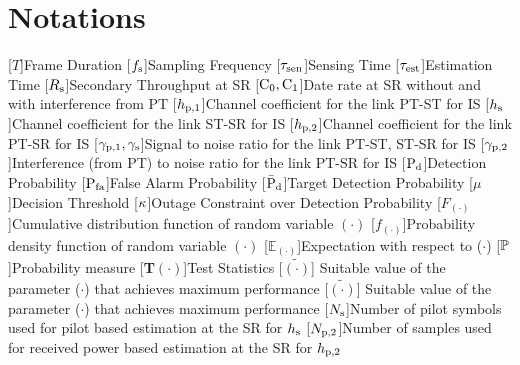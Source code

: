 \section*{Notations}
\begin{acronym}[ANNNNOVA]
 [$T$]{Frame Duration}
 [$f_{\text{s}}$]{Sampling Frequency}
 [$\tau_{\text{sen}}$]{Sensing Time}
 [$\tau_{\text{est}}$]{Estimation Time}
 [$R_{\text{s}}$]{Secondary Throughput at SR}
 [$\text{C}_{\text{0}},\text{C}_{\text{1}}$]{Date rate at SR without and with interference from PT}
 [$h_{\text{p,1}}$]{Channel coefficient for the link PT-ST for IS}
 [$h_{\text{s}}$]{Channel coefficient for the link ST-SR for IS}
 [$h_{\text{p,2}}$]{Channel coefficient for the link PT-SR for IS}
 [${\gamma}_{\text{p,1}}, {\gamma}_{\text{s}}$]{Signal to noise ratio for the link PT-ST, ST-SR for IS}
 [${\gamma}_{\text{p,2}}$]{Interference (from PT) to noise ratio for the link PT-SR for IS}
 [$\text{P}_{\text{d}}$]{Detection Probability} 
 [$\text{P}_{\text{fa}}$]{False Alarm Probability} 
 [$\bar{\text{P}}_{\text{d}}$]{Target Detection Probability} 
 [$\mu$]{Decision Threshold} 
 [$\kappa$]{Outage Constraint over Detection Probability} 
 [$F_{(\cdot)}$]{Cumulative distribution function of random variable $(\cdot)$}
 [$f_{(\cdot)}$]{Probability density function of random variable $(\cdot)$}
 [$\mathbb E_{(\cdot)} $]{Expectation with respect to ($\cdot$)}
 [$\mathbb P$]{Probability measure}
 [\textbf{T}$(\cdot)$]{Test Statistics}
 [$\tilde{(\cdot)}$]{ Suitable value of the parameter ($\cdot$) that achieves maximum performance}
 \acro{}[$\tilde{(\cdot)}$]{ Suitable value of the parameter ($\cdot$) that achieves maximum performance}
 [$N_{\text{s}}$]{Number of pilot symbols used for pilot based estimation at the SR for $h_{\text{s}}$}
 [$N_{\text{p,2}}$]{Number of samples used for received power based estimation at the SR for $h_{\text{p,2}}$}
\end{acronym}

